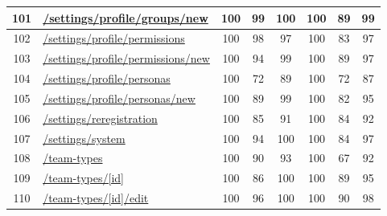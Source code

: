 \begin{longtable}{|c|p{5cm}|c|c|c|c|c|c|}
      \hline
      101                                      & \url{/settings/profile/groups/new}                         & 100              & 99               & 100              & 100              & 89               & 99            \\
      \hline
      102                                      & \url{/settings/profile/permissions}                        & 100              & 98               & 97               & 100              & 83               & 97            \\
      \hline
      103                                      & \url{/settings/profile/permissions/new}                    & 100              & 94               & 99               & 100              & 89               & 97            \\
      \hline
      104                                      & \url{/settings/profile/personas}                           & 100              & 72               & 89               & 100              & 72               & 87            \\
      \hline
      105                                      & \url{/settings/profile/personas/new}                       & 100              & 89               & 99               & 100              & 82               & 95            \\
      \hline
      106                                      & \url{/settings/reregistration}                             & 100              & 85               & 91               & 100              & 84               & 92            \\
      \hline
      107                                      & \url{/settings/system}                                     & 100              & 94               & 100              & 100              & 84               & 97            \\
      \hline
      108                                      & \url{/team-types}                                          & 100              & 90               & 93               & 100              & 67               & 92            \\
      \hline
      109                                      & \url{/team-types/[id]}                                     & 100              & 86               & 100              & 100              & 89               & 95            \\
      \hline
      110                                      & \url{/team-types/[id]/edit}                                & 100              & 96               & 100              & 100              & 90               & 98            \\

\end{longtable}
